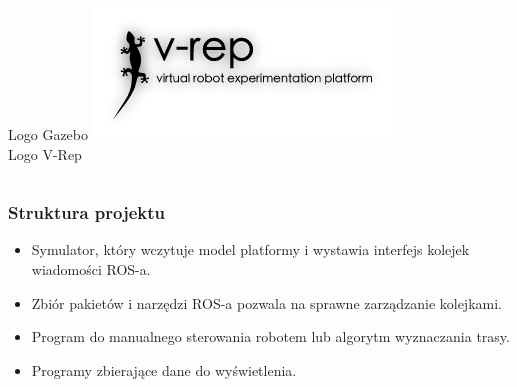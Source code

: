 \documentclass{beamer}
\begin{document}
\begin{frame}
\begin{columns}[c]
			Logo Gazebo\footnotemark[2]
			\centering
			\includegraphics[width=\textwidth]{graphics/vrep_logo.png} \\
			Logo V-Rep\footnotemark[3]
		\end{columns}
	\end{frame}

	\begin{frame}
		\frametitle{Struktura projektu}
		\begin{itemize}
			\item Symulator, który wczytuje model platformy i wystawia interfejs kolejek wiadomości ROS-a.
			\item Zbiór pakietów i narzędzi ROS-a pozwala na sprawne zarządzanie kolejkami.
			\item Program do manualnego sterowania robotem lub algorytm wyznaczania trasy.
			\item Programy zbierające dane do wyświetlenia.
		\end{itemize}
	\end{frame}
	
\end{document}
